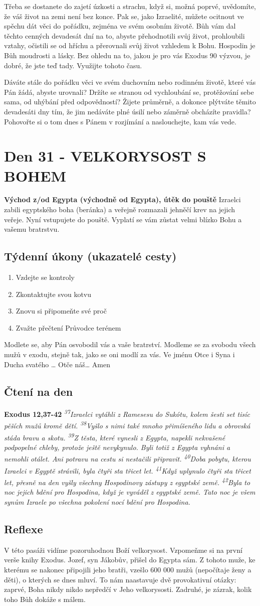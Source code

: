 \documentclass[11pt]{article}
\newcommand{\zacatekPatyTyden}{
  \textbf{Východ z/od Egypta (východně od Egypta), útěk do pouště} \newline
  Izraelci zabili egyptského boha (beránka) a veřejně rozmazali jehněčí krev na jejich veřeje. Nyní vstupujete
  do pouště. Vyplatí se vám zůstat velmi blízko Bohu a vašemu bratrstvu.

\subsection*{Týdenní úkony (ukazatelé cesty)}
\begin{enumerate}
  \item Vzdejte se kontroly
  \item Zkontaktujte svou kotvu
  \item Znovu si připomeňte své proč
  \item Zvažte přečtení Průvodce terénem
\end{enumerate}
Modlete se, aby Pán osvobodil vás a vaše bratrství. \newline
Modleme se za svobodu všech mužů v exodu, stejně tak, jako se oni modlí za vás.\newline
Ve jménu Otce i Syna i Ducha svatého …  Otče náš… Amen
}
\begin{document}
Třeba se dostanete do zajetí úzkosti a strachu, když si, možná poprvé, uvědomíte, že váš život na zemi není bez konce.
Pak se, jako Izraelité, můžete ocitnout ve spěchu dát věci do pořádku, zejména ve svém osobním životě. Bůh vám dal
těchto cenných devadesát dní na to, abyste přehodnotili svůj život, prohloubili vztahy, očistili se od hříchu a přerovnali
svůj život vzhledem k Bohu. Hospodin je Bůh moudrosti a lásky. Bez ohledu na to, jakou je pro vás Exodus 90
výzvou, je dobré, že jste teď tady. Využijte tohoto času.

Dáváte stále do pořádku věci ve svém duchovním nebo rodinném životě, které vás Pán žádá, abyste urovnali? Držíte se
stranou od vychloubání se, protěžování sebe sama, od uhýbání před odpovědností? Žijete průměrně, a dokonce plýtváte
těmito devadesáti dny tím, že jim nedáváte plné úsilí nebo záměrně obcházíte pravidla? Pohovořte si o tom dnes
s Pánem v rozjímání a naslouchejte, kam vás vede.


\newpage
\section{Den 31 - VELKORYSOST S BOHEM}
\zacatekPatyTyden
\subsection*{Čtení na den}
\textbf{Exodus 12,37-42}
\newline
\textit{
\textsuperscript{37}Izraelci vytáhli z Ramesesu do Sukótu, kolem šesti set tisíc pěších mužů kromě dětí.
\textsuperscript{38}Vyšlo s nimi také mnoho přimíšeného lidu a obrovská stáda bravu a skotu.
\textsuperscript{39}Z těsta, které vynesli z Egypta, napekli nekvašené podpopelné chleby, protože ještě nevykynulo. Byli totiž z Egypta vyhnáni a nemohli otálet. Ani potravu na cestu si nestačili připravit.
\textsuperscript{40}Doba pobytu, kterou Izraelci v Egyptě strávili, byla čtyři sta třicet let.
\textsuperscript{41}Když uplynulo čtyři sta třicet let, přesně na den vyšly všechny Hospodinovy zástupy z egyptské země.
\textsuperscript{42}Byla to noc jejich bdění pro Hospodina, když je vyváděl z egyptské země. Tato noc je všem synům Izraele po všechna pokolení nocí bdění pro Hospodina.
}

\subsection*{Reflexe}
V této pasáži vidíme pozoruhodnou Boží velkorysost. Vzpomeňme si na první verše knihy Exodus. Jozef, syn Jákobův,
přišel do Egypta sám. Z tohoto muže, ke kterému se nakonec připojili jeho bratři, vzešlo 600 000 mužů (nepočítaje
ženy a děti), o kterých se dnes mluví. To nám naastavuje dvě provokativní otázky: zaprvé, Boha nikdy nikdo nepředčí
v Jeho velkorysosti. Zadruhé, je zázrak, kolik toho Bůh dokáže s málem.
\end{document}

